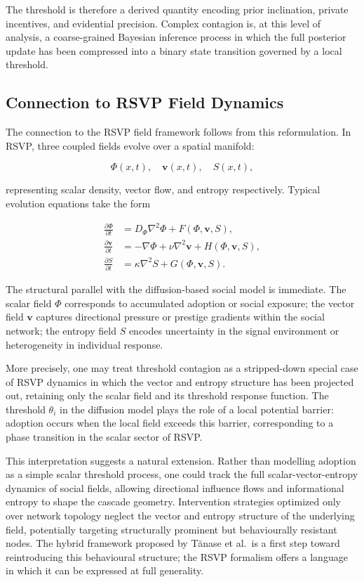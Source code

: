 \documentclass[12pt,a4paper]{article}
\theoremstyle{plain}
\theoremstyle{definition}
\begin{document}
The threshold is therefore a derived quantity encoding prior inclination, private incentives, and evidential precision. Complex contagion is, at this level of analysis, a coarse-grained Bayesian inference process in which the full posterior update has been compressed into a binary state transition governed by a local threshold.

\subsection{Connection to RSVP Field Dynamics}

The connection to the RSVP field framework follows from this reformulation. In RSVP, three coupled fields evolve over a spatial manifold:

\begin{equation}
\Phi(x,t), \quad \mathbf{v}(x,t), \quad S(x,t),
\end{equation}

representing scalar density, vector flow, and entropy respectively. Typical evolution equations take the form

\begin{align}
\frac{\partial \Phi}{\partial t} &= D_\Phi \nabla^2 \Phi + F(\Phi,\mathbf{v},S), \\
\frac{\partial \mathbf{v}}{\partial t} &= -\nabla\Phi + \nu\nabla^2\mathbf{v} + H(\Phi,\mathbf{v},S), \\
\frac{\partial S}{\partial t} &= \kappa\nabla^2 S + G(\Phi,\mathbf{v},S).
\end{align}

The structural parallel with the diffusion-based social model is immediate. The scalar field $\Phi$ corresponds to accumulated adoption or social exposure; the vector field $\mathbf{v}$ captures directional pressure or prestige gradients within the social network; the entropy field $S$ encodes uncertainty in the signal environment or heterogeneity in individual response.

More precisely, one may treat threshold contagion as a stripped-down special case of RSVP dynamics in which the vector and entropy structure has been projected out, retaining only the scalar field and its threshold response function. The threshold $\theta_i$ in the diffusion model plays the role of a local potential barrier: adoption occurs when the local field exceeds this barrier, corresponding to a phase transition in the scalar sector of RSVP.

This interpretation suggests a natural extension. Rather than modelling adoption as a simple scalar threshold process, one could track the full scalar-vector-entropy dynamics of social fields, allowing directional influence flows and informational entropy to shape the cascade geometry. Intervention strategies optimized only over network topology neglect the vector and entropy structure of the underlying field, potentially targeting structurally prominent but behaviourally resistant nodes. The hybrid framework proposed by Tănase et al.\ is a first step toward reintroducing this behavioural structure; the RSVP formalism offers a language in which it can be expressed at full generality.
\end{document}
